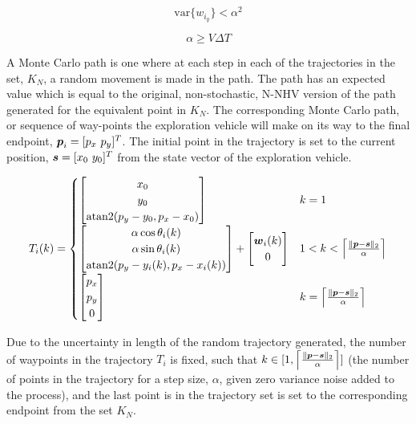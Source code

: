 \begin{equation}
\text{var}\{w_{i_y}\} < \alpha^2
\end{equation}

\begin{equation}
\alpha \geq V \Delta T
\end{equation}

A Monte Carlo path is one where at each step in each of the trajectories in the set, $K_N$, a random movement is made in the path. The path has an expected value which is equal to the original, non-stochastic, N-NHV version of the path generated for the equivalent point in $K_N$. The corresponding Monte Carlo path, or sequence of way-points the exploration vehicle will make on its way to the final endpoint, ${\it{\boldsymbol{p}}}_i = [p_x\ p_y]^T$. The initial point in the trajectory is set to the current position, ${\it{\boldsymbol{s}}}=[x_0\ y_0]^T$ from the state vector of the exploration vehicle.

\begin{equation}
\label{eq:mcpp}
T_{i}(k) = \begin{cases}
	\begin{bmatrix}
		x_0 \\
		y_0\\
		\text{atan2}(p_y - y_0, p_x - x_0)
	\end{bmatrix} & k=1 \\

	\begin{bmatrix}
		\alpha \cos \theta_i(k) \\
		\alpha \sin \theta_i(k) \\
		\text{atan2}(p_y - y_i(k), p_x - x_i(k))
	\end{bmatrix} + \begin{bmatrix} 
		{\it{\boldsymbol{w}}}_i(k) \\
		0
	\end{bmatrix} & 1 < k < \Big\lceil \frac{\|{\it{\boldsymbol{p}}} - {\it{\boldsymbol{s}}}\|_2}{\alpha} \Big\rceil \\


	\begin{bmatrix} p_x \\ p_y \\ 0\end{bmatrix} & k = \Big\lceil \frac{\|{\it{\boldsymbol{p}}} - {\it{\boldsymbol{s}}}\|_2}{\alpha} \Big\rceil \\

\end{cases}
\end{equation}

Due to the uncertainty in length of the random trajectory generated, the number of waypoints in the trajectory $T_i$ is fixed, such that $k \in [1, \Big\lceil \frac{\|{\it{\boldsymbol{p}}}- {\it{\boldsymbol{s}}}\|_2}{\alpha} \Big\rceil]$ (the number of points in the trajectory for a step size, $\alpha$, given zero variance noise added to the process), and the last point is in the trajectory set is set to the corresponding endpoint from the set $K_N$.

